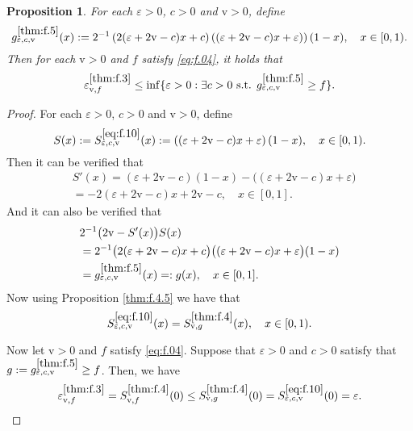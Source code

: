 \documentclass[12pt,a4paper]{amsart}
\numberwithin{equation}{section}
\theoremstyle{plain}
\newtheorem{proposition}[theorem]{Proposition}
\theoremstyle{remark}
\begin{document}
\begin{proposition} \label{thm:f.5}
	For each $\varepsilon >0 $, $c>0$ and $\mathrm v > 0$, define
	\[g_{\varepsilon, c, \mathrm v}^{\ref{thm:f.5}}(x) := 2^{-1} \left(2(\varepsilon + 2\mathrm v - c)x + c\right) \left((\varepsilon+2\mathrm v - c)x+ \varepsilon)\right)(1-x), \quad x\in [0,1).\]
	Then for each $\mathrm v>0$ and $f$ satisfy \eqref{eq:f.04}, it holds that
	\[
	\varepsilon_{\mathrm v, f}^{\ref{thm:f.3}} \leq \inf\{\varepsilon > 0: \exists c>0 \text{ s.t. } g_{\varepsilon, c, \mathrm v}^{\ref{thm:f.5}} \geq f\}.
	\]
\end{proposition}
\begin{proof}
	For each $\varepsilon >0 $, $c>0$ and $\mathrm v > 0$, define
	\begin{equation} \label{eq:f.10}
	S(x) 
	:= S_{\varepsilon, c, \mathrm v}^{\eqref{eq:f.10}}(x) 
	:=  \left( ( \varepsilon + 2 \mathrm v - c ) x + \varepsilon \right) ( 1 - x ), \quad x\in [0,1).
	\end{equation}
	Then it can be verified that
	\begin{align}
	&S'(x) =  ( \varepsilon + 2 \mathrm v - c )  ( 1 - x ) - \big( ( \varepsilon + 2 \mathrm v - c ) x + \varepsilon \big)
	\\& = - 2 ( \varepsilon + 2 \mathrm v - c ) x + 2 \mathrm v - c, \quad x\in [0,1].
	\end{align}
	And it can also be verified that
	\begin{align}
	&2^{-1}\big(2\mathrm v - S'(x)\big) S(x) 
	\\&=  2^{-1}\big( 2 ( \varepsilon + 2 \mathrm v - c ) x + c \big) \big( ( \varepsilon + 2 \mathrm v - c ) x + \varepsilon \big) ( 1 - x ) 
	\\&= g_{\varepsilon, c, \mathrm v}^{\ref{thm:f.5}}(x)
	=: g(x), \quad x\in [0,1].
	\end{align}
	Now using Proposition \ref{thm:f.4.5} we have that  
	\begin{equation}
	S_{\varepsilon, c, \mathrm v}^{\eqref{eq:f.10}}(x) = S^{\ref{thm:f.4}}_{\mathrm v, g}(x), \quad x\in [0,1).
	\end{equation}
	
	Now let $\mathrm v>0$ and $f$ satisfy \eqref{eq:f.04}.
	Suppose that $\varepsilon>0$ and $c>0$ satisfy that $g := g_{\varepsilon, c, \mathrm v}^{\ref{thm:f.5}} \geq f$.
	Then, we have
	\[
	\varepsilon_{\mathrm v, f}^{\ref{thm:f.3}} = S^{\ref{thm:f.4}}_{\mathrm v, f}(0) \leq S^{\ref{thm:f.4}}_{\mathrm v, g}(0) = S_{\varepsilon, c, \mathrm v}^{\eqref{eq:f.10}}(0) = \varepsilon.
	\qedhere
	\]
\end{proof}
\end{document}
